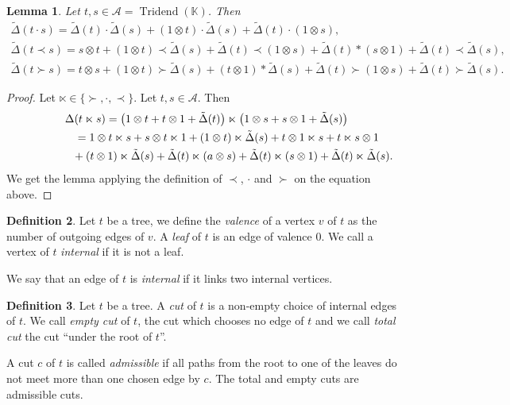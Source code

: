 \documentclass[10pt,a4paper]{amsart}
\numberwithin{equation}{section}
\theoremstyle{definition}
\newtheorem{defi}{Definition}[section]
\theoremstyle{plain}
\newtheorem{Lemme}[defi]{Lemma}
\newcommand{\K}{\mathbb{K}}
\DeclareMathOperator{\Tridend}{Tridend}
\begin{document}
 \begin{Lemme}
 	\label{cocalcul}
 	Let $t,s\in \mathcal{A}=\Tridend(\K)$. Then
 	\begin{gather*}
 		\tilde{\Delta}(t\cdot s) =\tilde{\Delta}(t)\cdot \tilde{\Delta}(s)+ (1\otimes t)\cdot \tilde{\Delta}(s)+\tilde{\Delta}(t)\cdot(1\otimes s), \\
 		\tilde{\Delta}(t\prec s) =s\otimes t+ (1\otimes t)\prec \tilde{\Delta}(s)+\tilde{\Delta}(t)\prec (1\otimes s)+\tilde{\Delta}(t)*(s\otimes 1)+\tilde{\Delta}(t)\prec \tilde{\Delta}(s), \\
 		\tilde{\Delta}(t\succ s) =t\otimes s+(1\otimes t)\succ\tilde{\Delta}(s)+(t\otimes 1)*\tilde{\Delta}(s)+\tilde{\Delta}(t)\succ (1\otimes s)+\tilde{\Delta}(t)\succ\tilde{\Delta}(s).
 	\end{gather*}
 \end{Lemme}
\begin{proof}
	Let $\ltimes\in\{ \succ,\cdot,\prec\}$. Let $t,s\in \mathcal{A}$. Then
	\begin{gather*}
		\Delta(t\ltimes s) =\big(1\otimes t+t\otimes 1+\tilde{\Delta}(t)\big)\ltimes \big(1\otimes s+s\otimes 1+\tilde{\Delta}(s)\big) \\
		\hphantom{\Delta(t\ltimes s)}{}=1\otimes t\ltimes s +s\otimes t\ltimes 1+(1\otimes t)\ltimes \tilde{\Delta}(s)+t\otimes 1\ltimes s+ t\ltimes s\otimes 1 \\
		\hphantom{\Delta(t\ltimes s =)}{}+ (t\otimes 1)\ltimes \tilde{\Delta}(s)
		+\tilde{\Delta}(t)\ltimes(a\otimes s)+\tilde{\Delta}(t)\ltimes (s\otimes 1)+\tilde{\Delta}(t)\ltimes \tilde{\Delta}(s).
		\end{gather*}
	We get the lemma applying the definition of $\prec$, $\cdot$ and $\succ$ on the equation above.
	\end{proof}

\begin{defi}
	Let $t$ be a tree, we define the \emph{valence} of a vertex $v$ of $t$ as the number of outgoing edges of $v$.
	A \emph{leaf} of $t$ is an edge of valence $0$. We call a vertex of $t$ \emph{internal} if it is not a leaf.
	
	We say that an edge of $t$ is \emph{internal} if it links two internal vertices.
\end{defi}

\begin{defi}%
	Let $t$ be a tree. A \emph{cut} of $t$ is a non-empty choice of internal edges of $t$. We call \emph{empty cut} of $t$, the cut which chooses no edge of $t$ and we call \emph{total cut} the cut ``under the root of $t$''.

	A cut $c$ of $t$ is called \emph{admissible} if all paths from the root to one of the leaves do not meet more than one chosen edge by $c$. The total and empty cuts are admissible cuts.
\end{defi}
\end{document}
